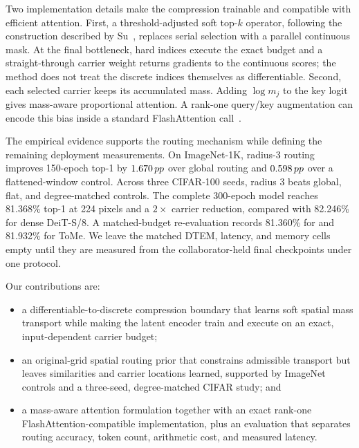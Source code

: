 Two implementation details make the compression trainable and compatible
with efficient attention. First, a threshold-adjusted soft top-$k$ operator,
following the construction described by Su~\cite{sujianlin2024topk}, replaces
serial selection with a parallel continuous mask. At the final bottleneck,
hard indices execute the exact budget and a straight-through carrier weight
returns gradients to the continuous scores; the method does not treat the
discrete indices themselves as differentiable. Second, each selected carrier
keeps its accumulated mass. Adding $\log m_j$ to the key logit gives
mass-aware proportional attention. A rank-one query/key augmentation can
encode this bias inside a standard FlashAttention call~\cite{flashattn2022}.

The empirical evidence supports the routing mechanism while defining the
remaining deployment measurements. On ImageNet-1K, radius-3 routing improves
150-epoch top-1 by $1.670\,pp$ over global routing and $0.598\,pp$ over a
flattened-window control. Across three CIFAR-100 seeds, radius 3 beats global,
flat, and degree-matched controls. The
complete 300-epoch model reaches 81.368\% top-1 at
224 pixels and a $2\times$ carrier reduction, compared with 82.246\% for
dense DeiT-S/8. A matched-budget re-evaluation records 81.360\% for \mn{} and
81.932\% for ToMe. We leave the matched DTEM, latency, and memory cells empty
until they are measured from the collaborator-held final checkpoints under
one protocol.

Our contributions are:
\begin{itemize}
  \item a differentiable-to-discrete compression boundary that learns soft
  spatial mass transport while making the latent encoder train and execute on
  an exact, input-dependent carrier budget;
  \item an original-grid spatial routing prior that constrains admissible
  transport but leaves similarities and carrier locations learned, supported
  by ImageNet controls and a three-seed, degree-matched CIFAR study; and
  \item a mass-aware attention formulation together with an exact rank-one
  FlashAttention-compatible implementation, plus an evaluation that separates
  routing accuracy, token count, arithmetic cost, and measured latency.
\end{itemize}
